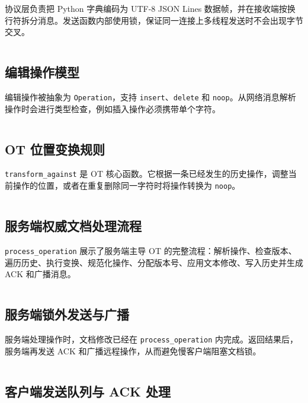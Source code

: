 协议层负责把 Python 字典编码为 UTF-8 JSON Lines 数据帧，并在接收端按换行符拆分消息。发送函数内部使用锁，保证同一连接上多线程发送时不会出现字节交叉。

\inputminted[firstline=15,lastline=65]{python}{protocol.py}

\subsection{编辑操作模型}

编辑操作被抽象为 \verb|Operation|，支持 \verb|insert|、\verb|delete| 和 \verb|noop|。从网络消息解析操作时会进行类型检查，例如插入操作必须携带单个字符。

\inputminted[firstline=15,lastline=49]{python}{document.py}

\subsection{OT 位置变换规则}

\verb|transform_against| 是 OT 核心函数。它根据一条已经发生的历史操作，调整当前操作的位置，或者在重复删除同一字符时将操作转换为 \verb|noop|。

\inputminted[firstline=102,lastline=140]{python}{document.py}

\subsection{服务端权威文档处理流程}

\verb|process_operation| 展示了服务端主导 OT 的完整流程：解析操作、检查版本、遍历历史、执行变换、规范化操作、分配版本号、应用文本修改、写入历史并生成 ACK 和广播消息。

\inputminted[firstline=163,lastline=282]{python}{document.py}

\subsection{服务端锁外发送与广播}

服务端处理操作时，文档修改已经在 \verb|process_operation| 内完成。返回结果后，服务端再发送 ACK 和广播远程操作，从而避免慢客户端阻塞文档锁。

\inputminted[firstline=209,lastline=281]{python}{server.py}

\subsection{客户端发送队列与 ACK 处理}


